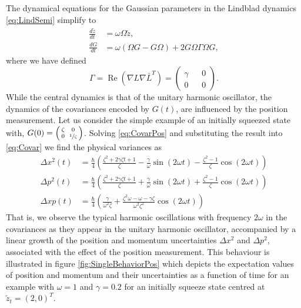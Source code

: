 \documentclass[12pt]{iopart} %
\renewcommand{\Re}{\operatorname{Re}}
\begin{document}
The dynamical equations for the Gaussian parameters in the Lindblad dynamics \cref{eq:LindSemi} simplify to
\begin{align} 
    \frac{d \tilde z}{d t} &= \omega\Omega \tilde z,\\
  	\frac{dG}{dt} &=\omega(\Omega G-G\Omega)+2 G \Omega \Gamma\Omega G, \label{eq:CovarPos}
\end{align}
where we have defined 
\begin{equation}
   \Gamma=\Re(\nabla L\nabla\bar{L}^{T})=\begin{pmatrix}\gamma && 0 \\ 0 && 0 \end{pmatrix}.
\end{equation}
While the central dynamics is that of the unitary harmonic oscillator, the dynamics of the covariances encoded by $G(t)$, are influenced by the position measurement. Let us consider the simple example of an initially squeezed state with, $G(0)=\left(\begin{smallmatrix}\zeta&&0\\0&&\sfrac{1}{\zeta}\end{smallmatrix}\right)$. Solving \cref{eq:CovarPos} and substituting the result into \cref{eq:Covar} we find the physical variances as
\begin{equation}
\begin{aligned}
    \Delta x^2(t)&=
\frac{\hbar}{4 }\left(
\frac{\zeta ^2+2 \gamma  \zeta  t+1}{\zeta}-\frac{\gamma}{\omega} \sin (2 \omega t)-\frac{\zeta ^2-1}{\zeta}  \cos (2 \omega t )\right)\\
    \Delta p^2(t)&=\frac{\hbar}{4}\left(\frac{\zeta ^2+2
   \gamma  \zeta  t+1}{\zeta}+\frac{\gamma}{\omega} \sin (2 \omega t )+\frac{\zeta ^2-1}{\zeta}\cos (2 \omega t )\right)\\
   \Delta xp(t)&=\frac{\hbar}{4} \left(\frac{\gamma}{ \omega^2\zeta}+\frac{\zeta^2\omega-\omega- \gamma\zeta}{\omega^2\zeta^2}\cos(2 \omega t)\right) 
\end{aligned}
\end{equation}
That is, we observe the typical harmonic oscillations with frequency $2\omega$ in the covariances as they appear in the unitary harmonic oscillator, accompanied by a linear growth of the position and momentum uncertainties $\Delta x^2$ and $\Delta p^2$, associated with the effect of the position measurement. This behaviour is illustrated in figure \ref{fig:SingleBehaviorPos} which depicts the expectation values of position and momentum and their uncertainties as a function of time for an example with $\omega=1$ and $\gamma=0.2$ for an initially squeeze state centred at $\tilde z_t=(2, 0)^T$.
\end{document}
